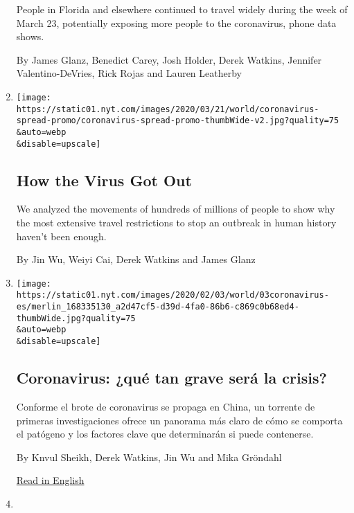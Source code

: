 \begin{enumerate}
  People in Florida and elsewhere continued to travel widely during the
  week of March 23, potentially exposing more people to the coronavirus,
  phone data shows.

  By James Glanz, Benedict Carey, Josh Holder, Derek Watkins, Jennifer
  Valentino-DeVries, Rick Rojas and Lauren Leatherby
\item
  \href{/interactive/2020/03/22/world/coronavirus-spread.html}{}

  \texttt{[image: https://static01.nyt.com/images/2020/03/21/world/coronavirus-spread-promo/coronavirus-spread-promo-thumbWide-v2.jpg?quality=75\\\&auto=webp\\\&disable=upscale]}

  \hypertarget{how-the-virus-got-out}{%
  \subsection{How the Virus Got Out}\label{how-the-virus-got-out}}

  We analyzed the movements of hundreds of millions of people to show
  why the most extensive travel restrictions to stop an outbreak in
  human history haven't been enough.

  By Jin Wu, Weiyi Cai, Derek Watkins and James Glanz
\item
  \href{/es/2020/02/04/espanol/mundo/coronavirus-vacuna-viaje.html}{}

  \texttt{[image: https://static01.nyt.com/images/2020/02/03/world/03coronavirus-es/merlin\_168335130\_a2d47cf5-d39d-4fa0-86b6-c869c0b68ed4-thumbWide.jpg?quality=75\\\&auto=webp\\\&disable=upscale]}

  \hypertarget{coronavirus-quuxe9-tan-grave-seruxe1-la-crisis}{%
  \subsection{Coronavirus: ¿qué tan grave será la
  crisis?}\label{coronavirus-quuxe9-tan-grave-seruxe1-la-crisis}}

  Conforme el brote de coronavirus se propaga en China, un torrente de
  primeras investigaciones ofrece un panorama más claro de cómo se
  comporta el patógeno y los factores clave que determinarán si puede
  contenerse.

  By Knvul Sheikh, Derek Watkins, Jin Wu and Mika Gröndahl

  \href{https://www.nytimes.com/interactive/2020/world/asia/china-coronavirus-contain.html}{Read
  in English}
\item
  \href{/interactive/2020/02/01/us/politics/democratic-presidential-campaign-donors.html}{}


\end{enumerate}

